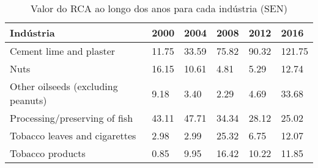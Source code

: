 \begin{table}
\centering
\caption{Valor do RCA ao longo dos anos para cada indústria (SEN)}
\begin{tabular}{p{6cm}p{1.5cm}p{1.5cm}p{1.5cm}p{1.5cm}p{1.5cm}}
\toprule
                         Indústria &  2000 &  2004 &  2008 &  2012 &   2016 \\
\midrule
           Cement lime and plaster & 11.75 & 33.59 & 75.82 & 90.32 & 121.75 \\
                              Nuts & 16.15 & 10.61 &  4.81 &  5.29 &  12.74 \\
Other oilseeds (excluding peanuts) &  9.18 &  3.40 &  2.29 &  4.69 &  33.68 \\
     Processing/preserving of fish & 43.11 & 47.71 & 34.34 & 28.12 &  25.02 \\
     Tobacco leaves and cigarettes &  2.98 &  2.99 & 25.32 &  6.75 &  12.07 \\
                  Tobacco products &  0.85 &  9.95 & 16.42 & 10.22 &  11.85 \\
\bottomrule
\end{tabular}
\end{table}
